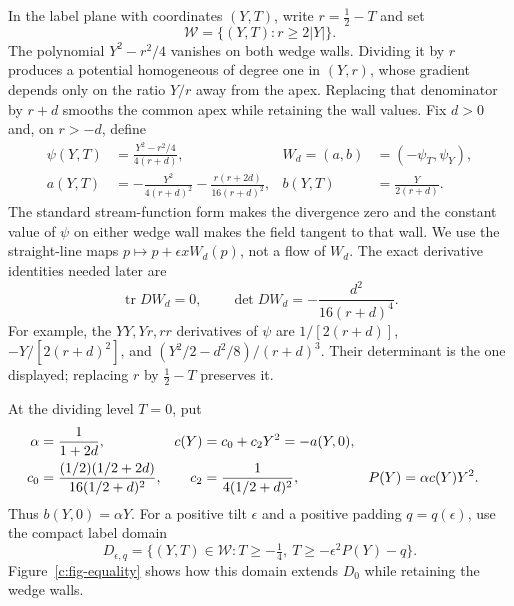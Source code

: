 In the label plane with coordinates $(Y,T)$, write $r=\tfrac12-T$ and set
\[
 \mathcal W=\{(Y,T):r\ge2|Y|\}.
\]
The polynomial $Y^2-r^2/4$ vanishes on both wedge walls.
Dividing it by $r$ produces a potential homogeneous of degree one in $(Y,r)$,
whose gradient depends only on the ratio $Y/r$ away from the apex.
Replacing that denominator by $r+d$ smooths the common apex while
retaining the wall values.  Fix $d>0$ and, on $r>-d$, define
\begin{align}
 \psi(Y,T)&=\frac{Y^2-r^2/4}{4(r+d)}, &
 W_d=(a,b)&=(-\psi_T,\psi_Y),\label{c:rat-potential}\\
 a(Y,T)&=-\frac{Y^2}{4(r+d)^2}
          -\frac{r(r+2d)}{16(r+d)^2}, &
 b(Y,T)&=\frac{Y}{2(r+d)}.\label{c:rat-field}
\end{align}
The standard stream-function form makes the divergence zero and the constant
value of $\psi$ on either wedge wall makes the field tangent to that wall.
We use the straight-line maps $p\mapsto p+\epsilon xW_d(p)$,
not a flow of $W_d$.  The exact derivative identities needed later are
\begin{equation}\label{c:rat-spectrum}
 \operatorname{tr}DW_d=0,\qquad
 \det DW_d=-\frac{d^2}{16(r+d)^4}.
\end{equation}
For example, the $YY,Yr,rr$ derivatives of $\psi$ are
$1/[2(r+d)]$, $-Y/[2(r+d)^2]$, and
$(Y^2/2-d^2/8)/(r+d)^3$.  Their determinant is the one displayed;
replacing $r$ by $\tfrac12-T$ preserves it.

At the dividing level $T=0$, put
\begin{align}
 \alpha&=\frac1{1+2d},&
 c(Y)&=c_0+c_2Y^2=-a(Y,0),\notag\\
 c_0&=\frac{(1/2)(1/2+2d)}{16(1/2+d)^2},&
 c_2&=\frac1{4(1/2+d)^2},&
 P(Y)&=\alpha c(Y)Y^2.\label{c:rat-ceiling-polynomial}
\end{align}
Thus $b(Y,0)=\alpha Y$.  For a positive tilt $\epsilon$ and a
positive padding $q=q(\epsilon)$, use the compact label domain
\begin{equation}\label{c:rat-domain}
 D_{\epsilon,q}=\{(Y,T)\in\mathcal W:T\ge-\tfrac14,
                         \ T\ge-\epsilon^2P(Y)-q\}.
\end{equation}
Figure~\ref{c:fig-equality} shows how this domain extends $D_0$
while retaining the wedge walls.



